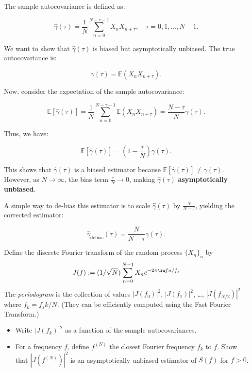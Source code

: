 \documentclass[11pt]{article}
\begin{document}
\begin{solution}

The sample autocovariance is defined as:

\[
\hat{\gamma}(\tau) = \frac{1}{N} \sum_{n=0}^{N-\tau-1} X_n X_{n+\tau}, \quad \tau = 0, 1, \dots, N-1.
\]

We want to show that \(\hat{\gamma}(\tau)\) is biased but asymptotically unbiased. The true autocovariance is:

\[
\gamma(\tau) = \mathbb{E}(X_n X_{n+\tau}).
\]

Now, consider the expectation of the sample autocovariance:

\[
\mathbb{E}[\hat{\gamma}(\tau)] = \frac{1}{N} \sum_{n=0}^{N-\tau-1} \mathbb{E}(X_n X_{n+\tau}) = \frac{N-\tau}{N} \gamma(\tau).
\]

Thus, we have:

\[
\mathbb{E}[\hat{\gamma}(\tau)] = \left(1 - \frac{\tau}{N}\right) \gamma(\tau).
\]

This shows that \(\hat{\gamma}(\tau)\) is a biased estimator because \(\mathbb{E}[\hat{\gamma}(\tau)] \neq \gamma(\tau)\). However, as \(N \to \infty\), the bias term \(\frac{\tau}{N} \to 0\), making \(\hat{\gamma}(\tau)\) \textbf{asymptotically unbiased}.

A simple way to de-bias this estimator is to scale \(\hat{\gamma}(\tau)\) by \(\frac{N}{N-\tau}\), yielding the corrected estimator:

\[
\hat{\gamma}_{\text{debias}}(\tau) = \frac{N}{N-\tau} \hat{\gamma}(\tau).
\]

\end{solution}

\begin{exercise}
Define the discrete Fourier transform of the random process $\{X_n\}_n$ by
\begin{equation}
    J(f) := (1/\sqrt{N})\sum_{n=0}^{N-1} X_n e^{-2\pi\iu f n/f_s}
\end{equation}
The \textit{periodogram} is the collection of values $|J(f_0)|^2$, $|J(f_1)|^2$, \dots, $|J(f_{N/2})|^2$ where $f_k = f_s k/N$.
(They can be efficiently computed using the Fast Fourier Transform.)
\begin{itemize}
    \item Write $|J(f_k)|^2$ as a function of the sample autocovariances.
    \item For a frequency $f$, define $f^{(N)}$ the closest Fourier frequency $f_k$ to $f$.
    Show that $|J(f^{(N)})|^2$ is an asymptotically unbiased estimator of $S(f)$ for $f>0$.
\end{itemize}
\end{exercise}
\end{document}
